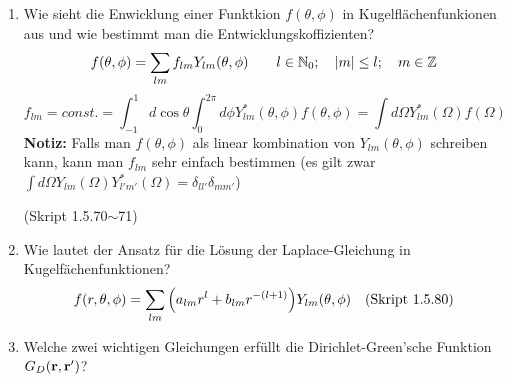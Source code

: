 \documentclass{scrartcl}
\newcommand{\ds}{\displaystyle}
\begin{document}
\begin{enumerate}
    \item Wie sieht die Enwicklung einer Funktkion $f(\theta,\phi)$ in
          Kugelflächenfunkionen aus und wie bestimmt man die 
          Entwicklungskoffizienten?
          $$\ds f(\theta, \phi)=\sum_{lm} f_{lm}Y_{lm}(\theta,\phi)
          \qquad l\in \mathbb{N}_0;\quad \abs{m}\le l; 
          \quad m\in\mathbb{Z}$$
          $$\ds f_{lm}=const.
           =\int_{-1}^{1} d\cos\theta\int_0^{2\pi}d\phi 
           Y^*_{lm}(\theta,\phi)f(\theta,\phi)
           =\int d\Omega Y^*_{lm}(\Omega)f(\Omega)$$
           \textbf{Notiz:} Falls man $f(\theta,\phi)$ als linear kombination
           von $Y_{lm}(\theta,\phi)$ schreiben kann, kann man $f_{lm}$
           sehr einfach bestimmen (es gilt zwar $\ds \int d\Omega 
           Y_{lm}(\Omega)Y_{l'm'}^*(\Omega)=\delta_{ll'}\delta_{mm'}$)
          \begin{center}
            (Skript 1.5.70$\sim$71)
          \end{center}

    \item Wie lautet der Ansatz für die Lösung der Laplace-Gleichung in
          Kugelfächenfunktionen?\\
          $$f(r,\theta,\phi)=
          \sum_{lm}\qty(a_{lm}r^l+b_{lm}r^{-(l+1)})Y_{lm}(\theta,\phi)
          \quad\text{(Skript 1.5.80)}$$
           
    \item Welche zwei wichtigen Gleichungen erfüllt die Dirichlet-Green'sche
          Funktion $G_D(\vb r, \vb r')$?


\end{enumerate}
\end{document}
